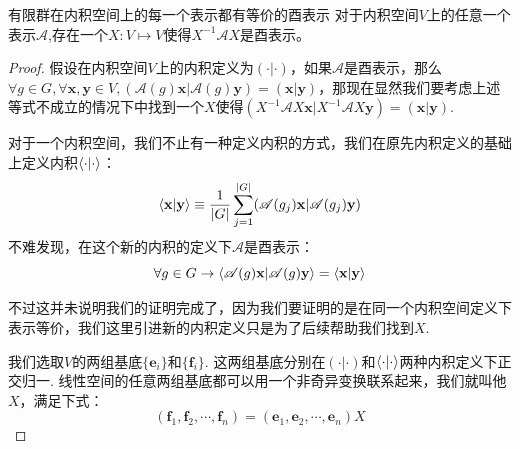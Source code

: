 \begin{theorem}{有限群在内积空间上的每一个表示都有等价的酉表示}	
	对于内积空间$V$上的任意一个表示$\mathscr{A}$,存在一个$X:V\mapsto V$使得$X^{-1}\mathscr{A}X$是酉表示。
\end{theorem}
\begin{proof}
	假设在内积空间$V$上的内积定义为$(\cdot|\cdot)$，如果$\mathscr{A}$是酉表示，那么$\forall g\in G,\forall \mathbf{x},\mathbf{y}\in V,(\mathscr{A}(g)\mathbf{x}|\mathscr{A}(g)\mathbf{y})=(\mathbf{x}|\mathbf{y})$，那现在显然我们要考虑上述等式不成立的情况下中找到一个$X$使得$(X^{-1}\mathscr{A}X\mathbf{x}|X^{-1}\mathscr{A}X\mathbf{y})=(\mathbf{x}|\mathbf{y})$.
	
	对于一个内积空间，我们不止有一种定义内积的方式，我们在原先内积定义的基础上定义内积$\braket{\cdot|\cdot}$：
	\[\braket{\mathbf{x}|\mathbf{y}}\equiv\frac{1}{|G|}\sum\limits_{j=1}^{|G|}(\mathscr{A}(g_j)\mathbf{x}|\mathscr{A}(g_j)\mathbf{y})\]
	不难发现，在这个新的内积的定义下$\mathscr{A}$是酉表示：
	\[\forall g\in G\rightarrow\braket{\mathscr{A}(g)\mathbf{x}|\mathscr{A}(g)\mathbf{y}}=\braket{\mathbf{x}|\mathbf{y}}\]
	
	不过这并未说明我们的证明完成了，因为我们要证明的是在同一个内积空间定义下表示等价，我们这里引进新的内积定义只是为了后续帮助我们找到$X$.
	
	我们选取$V$的两组基底$\{\mathbf{e}_i\}$和$\{\mathbf{f}_i\}$. 这两组基底分别在$(\cdot|\cdot)$和$\braket{\cdot|\cdot}$两种内积定义下正交归一.
	线性空间的任意两组基底都可以用一个非奇异变换联系起来，我们就叫他$X$，满足下式：
	\[(\mathbf{f}_1,\mathbf{f}_2,\cdots,\mathbf{f}_n)=(\mathbf{e}_1,\mathbf{e}_2,\cdots,\mathbf{e}_n)X\]
	

\end{proof}
